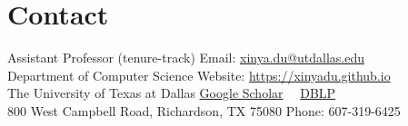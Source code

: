 \section{Contact}
\noindent Assistant Professor (tenure-track) \hfill Email: \href{mailto:xinya.du@utdallas.edu}{{xinya.du@utdallas.edu}} \\
Department of Computer Science \hfill Website: \href{https://xinyadu.github.io}{https://xinyadu.github.io} \\
The University of Texas at Dallas \hfill \href{https://scholar.google.com/citations?user=R-lKQqkAAAAJ&hl=en}{Google Scholar} \ \textperiodcentered\ \href{https://dblp.org/pid/200/8114.html}{DBLP}
\\
800 West Campbell Road, Richardson, TX 75080 \hfill Phone: 607-319-6425
